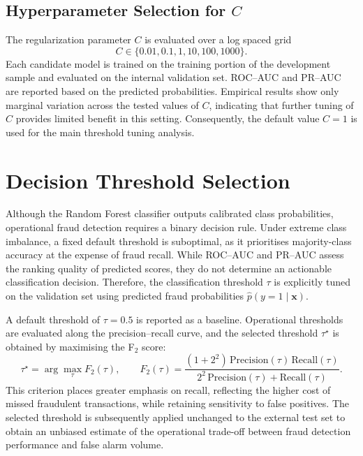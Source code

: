 \documentclass[oneside,12pt,parskip=half,american,numbers=noenddot]{scrreprt}
\begin{document}
\subsection{Hyperparameter Selection for $C$}
The regularization parameter $C$ is evaluated over a log spaced grid
\[
C \in \{0.01, 0.1, 1, 10, 100, 1000\}.
\]
Each candidate model is trained on the training portion of the development sample and evaluated on the internal validation set. ROC--AUC and PR--AUC are reported based on the predicted probabilities. Empirical results show only marginal variation across the tested values of $C$, indicating that further tuning of $C$ provides limited benefit in this setting. Consequently, the default value $C=1$ is used for the main threshold tuning analysis.


\section{Decision Threshold Selection}
Although the Random Forest classifier outputs calibrated class probabilities, operational fraud detection requires a binary decision rule. Under extreme class imbalance, a fixed default threshold is suboptimal, as it prioritises majority-class accuracy at the expense of fraud recall. While ROC--AUC and PR--AUC assess the ranking quality of predicted scores, they do not determine an actionable classification decision. Therefore, the classification threshold $\tau$ is explicitly tuned on the validation set using predicted fraud probabilities $\hat{p}(y=1 \mid \mathbf{x})$.

A default threshold of $\tau = 0.5$ is reported as a baseline. Operational thresholds are evaluated along the precision--recall curve, and the selected threshold $\tau^\star$ is obtained by maximising the F$_2$ score:
\[
\tau^\star = \arg\max_{\tau} F_2(\tau), 
\qquad 
F_2(\tau)=\frac{(1+2^2)\,\mathrm{Precision}(\tau)\,\mathrm{Recall}(\tau)}{2^2\,\mathrm{Precision}(\tau)+\mathrm{Recall}(\tau)}.
\]
This criterion places greater emphasis on recall, reflecting the higher cost of missed fraudulent transactions, while retaining sensitivity to false positives. The selected threshold is subsequently applied unchanged to the external test set to obtain an unbiased estimate of the operational trade-off between fraud detection performance and false alarm volume.
\end{document}
